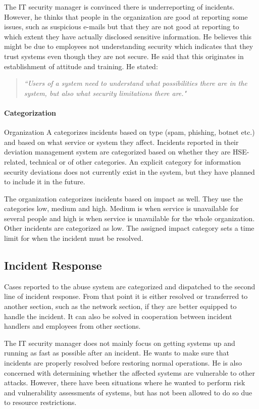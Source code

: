 The IT security manager is convinced there is underreporting of incidents. However, he thinks that people in the organization are good at reporting some issues, such as suspicious e-mails but that they are not good at reporting to which extent they have actually disclosed sensitive information. He believes this might be due to employees not understanding security which indicates that they trust systems even though they are not secure. He said that this originates in establishment of attitude and training. He stated:

\begin{quote}
\textit{``Users of a system need to understand what possibilities there are in the system, but also what security limitations there are."} 
\end{quote}

\paragraph{Categorization}
Organization A categorizes incidents based on type (spam, phishing, botnet etc.) and based on what service or system they affect. Incidents reported in their deviation management system are categorized based on whether they are \ac{HSE}-related, technical or of other categories. An explicit category for information security deviations does not currently exist in the system, but they have planned to include it in the future.

The organization categorizes incidents based on impact as well. They use the categories low, medium and high. Medium is when service is unavailable for several people and high is when service is unavailable for the whole organization. Other incidents are categorized as low. The assigned impact category sets a time limit for when the incident must be resolved.

\subsection{Incident Response}
Cases reported to the abuse system are categorized and dispatched to the second line of incident response. %
From that point it is either resolved or transferred to another section, such as the network section, if they are better equipped to handle the incident. It can also be solved in cooperation between incident handlers and employees from other sections.

The IT security manager does not mainly focus on getting systems up and running as fast as possible after an incident. He wants to make sure that incidents are properly resolved before restoring normal operations. He is also concerned with determining whether the affected systems are vulnerable to other attacks. However, there have been situations where he wanted to perform risk and vulnerability assessments of systems, but has not been allowed to do so due to resource restrictions.


